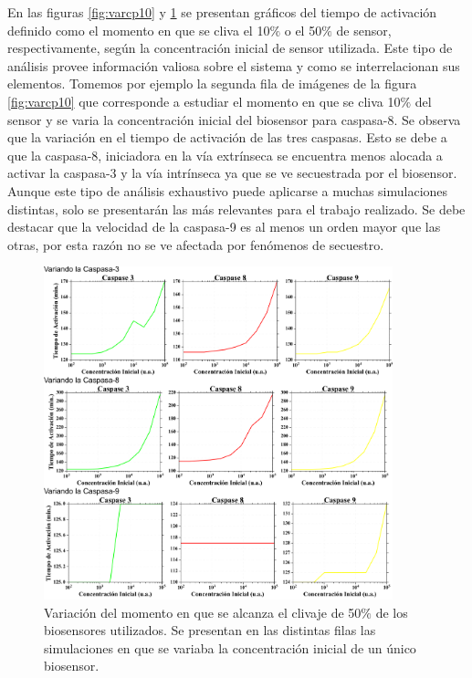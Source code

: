 En las figuras \ref{fig:varcp10} y \ref{fig:varcp50} se presentan gráficos del tiempo de activación definido como el momento en que se cliva el 10$\%$ o el 50$\%$ de sensor, respectivamente, según la concentración inicial de sensor utilizada. Este tipo de análisis provee información valiosa sobre el sistema y como se interrelacionan sus elementos. Tomemos por ejemplo la segunda fila de imágenes de la figura \ref{fig:varcp10} que corresponde a estudiar el momento en que se cliva 10$\%$ del sensor y se varia la concentración inicial del biosensor para caspasa-8. Se observa que la variación en el tiempo de activación de las tres caspasas. Esto se debe a que la caspasa-8, iniciadora en la vía extrínseca se encuentra menos alocada a activar la caspasa-3 y la vía intrínseca ya que se ve secuestrada por el biosensor. Aunque este tipo de análisis exhaustivo puede aplicarse a muchas simulaciones distintas, solo se presentarán las más relevantes para el trabajo realizado. Se debe destacar que la velocidad de la caspasa-9 es al menos un orden mayor que las otras, por esta razón no se ve afectada por fenómenos de secuestro.

\begin{figure}
    \centering
    \includegraphics[width=0.9\textwidth]{./img/Cap3/Varcp50.png}
    \caption{Variación del momento en que se alcanza el clivaje de 50$\%$ de los biosensores utilizados. Se presentan en las distintas filas las simulaciones en que se variaba la concentración inicial de un único biosensor.}
    \label{fig:varcp50}
\end{figure}

